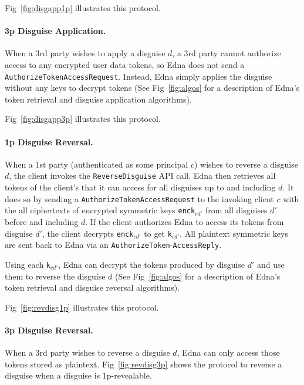 Fig~\ref{fig:disgapp1p} illustrates this protocol.

\paragraph{3p Disguise Application.}
When a 3rd party wishes to apply a disguise $d$, a 3rd party cannot authorize access to any encrypted user data tokens, so Edna does not
send a \texttt{AuthorizeToken}\texttt{AccessRequest}. Instead, Edna simply applies the disguise  
without any keys to decrypt tokens (See Fig~\ref{fig:algos} for a description of Edna's
token retrieval and disguise application algorithms).

Fig~\ref{fig:disgapp3p} illustrates this protocol.

\paragraph{1p Disguise Reversal.}
When a 1st party (authenticated as some principal $c$) wishes to reverse a disguise $d$, the client
invokes the \texttt{ReverseDisguise} API call. Edna then retrieves all tokens of the client's that
it can access for all disguises up to and including $d$. It does so by sending a
\texttt{AuthorizeToken}\texttt{AccessRequest} to the invoking client $c$ with the all ciphertexts of
encrypted symmetric keys \texttt{enck}$_{cd'}$ from all disguises $d'$ before and including $d$. If
the client authorizes Edna to access its tokens from disguise $d'$, the client decrypts
\texttt{enck}$_{cd'}$ to get \texttt{k}$_{cd'}$. All plaintext symmetric keys are sent back to Edna
via an \texttt{AuthorizeToken}-\texttt{AccessReply}. 

Using each \texttt{k}$_{cd'}$, Edna can decrypt the tokens produced by disguise $d'$ and use them to
reverse the disguise $d$ (See Fig~\ref{fig:algos} for a description of Edna's token retrieval and
disguise reversal algorithms).

Fig~\ref{fig:revdisg1p} illustrates this protocol.

\paragraph{3p Disguise Reversal.}
When a 3rd party wishes to reverse a disguise $d$, Edna can only access those tokens stored as
plaintext. 
Fig~\ref{fig:revdisg3p} shows the protocol to reverse a disguise when a disguise is 1p-revealable.


